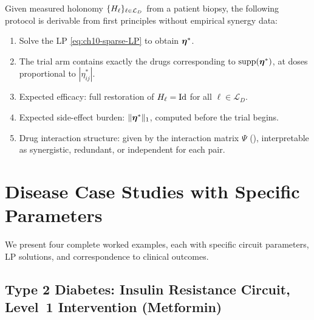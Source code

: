 \begin{proposition}
\label{prop:trial-design}
Given measured holonomy $\{H_\ell\}_{\ell \in \mathcal{L}_D}$ from a patient
biopsy, the following protocol is derivable from first principles without
empirical synergy data:
\begin{enumerate}[label=(\roman*)]
  \item Solve the LP \eqref{eq:ch10-sparse-LP} to obtain $\boldsymbol{\eta}^*$.
  \item The trial arm contains exactly the drugs corresponding to
    $\mathrm{supp}(\boldsymbol{\eta}^*)$, at doses proportional to $|\eta_{ij}^*|$.
  \item Expected efficacy: full restoration of $H_\ell = \mathrm{Id}$
    for all $\ell \in \mathcal{L}_D$.
  \item Expected side-effect burden: $\|\boldsymbol{\eta}^*\|_1$, computed before
    the trial begins.
  \item Drug interaction structure: given by the interaction matrix $\Psi$
    (), interpretable as synergistic, redundant,
    or independent for each pair.
\end{enumerate}
\end{proposition}

\section{Disease Case Studies with Specific Parameters}
\label{sec:case-studies}

We present four complete worked examples, each with specific circuit parameters,
LP solutions, and correspondence to clinical outcomes.

\subsection{Type 2 Diabetes: Insulin Resistance Circuit, Level~1 Intervention (Metformin)}
\label{sec:case-t2d}

